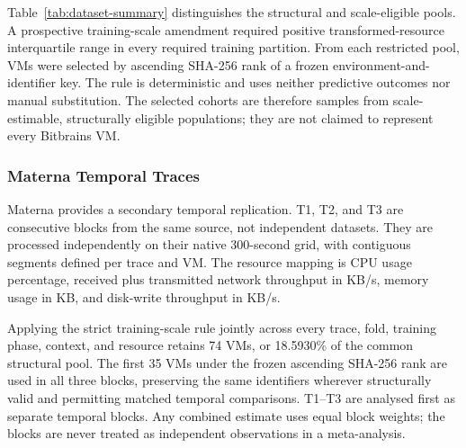 \documentclass[5p,twocolumn]{elsarticle}
\begin{document}
Table~\ref{tab:dataset-summary} distinguishes the structural and scale-eligible
pools. A prospective training-scale amendment required positive
transformed-resource interquartile range in every required training partition.
From each restricted pool, VMs were selected by ascending
SHA-256 rank of a frozen environment-and-identifier key.  The rule is
deterministic and uses neither predictive outcomes nor manual substitution.
The selected cohorts are therefore samples from scale-estimable, structurally
eligible populations; they are not claimed to represent every Bitbrains VM.

\subsubsection{Materna Temporal Traces}
\label{sec:materna-data}

Materna provides a secondary temporal replication.  T1, T2, and T3 are
consecutive blocks from the same source, not independent datasets.  They are
processed independently on their native 300-second grid, with contiguous
segments defined per trace and VM.  The resource mapping is CPU usage
percentage, received plus transmitted network throughput in KB/s, memory usage
in KB, and disk-write throughput in KB/s.

Applying the strict training-scale rule jointly across every trace, fold, training phase,
context, and resource retains 74 VMs, or 18.5930\% of the common structural
pool.  The first 35 VMs under the frozen ascending SHA-256 rank are used in all
three blocks, preserving the same identifiers wherever structurally valid and
permitting matched temporal comparisons.  T1--T3 are analysed first as
separate temporal blocks.  Any combined estimate uses equal block weights;
the blocks are never treated as independent observations in a meta-analysis.
\end{document}
